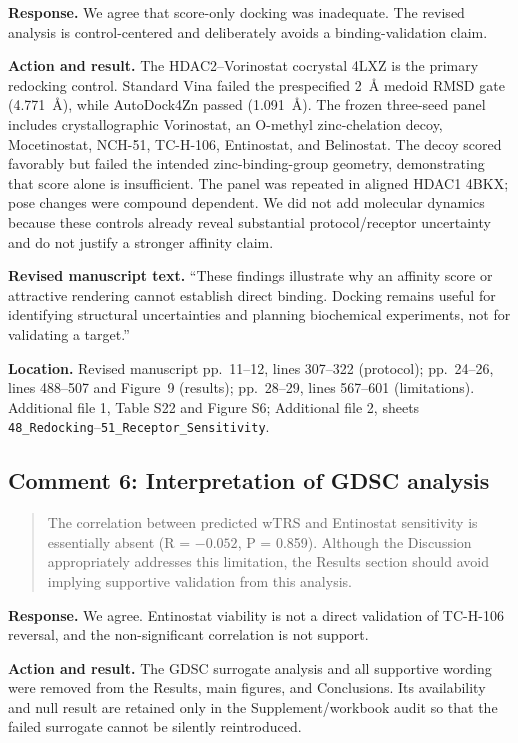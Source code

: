 \documentclass[10pt]{article}
\newenvironment{reviewcomment}{%
  \begin{quote}\small\itshape\color{black}
}{\end{quote}}
\newcommand{\Response}{\textbf{Response.} }
\newcommand{\Action}{\textbf{Action and result.} }
\newcommand{\RevisedText}{\textbf{Revised manuscript text.} }
\newcommand{\Location}{\textbf{Location.} }
\newcommand{\qtext}[1]{``#1''}
\begin{document}
\Response We agree that score-only docking was inadequate. The revised analysis is control-centered and deliberately avoids a binding-validation claim.

\Action The HDAC2--Vorinostat cocrystal 4LXZ is the primary redocking control. Standard Vina failed the prespecified 2~\AA{} medoid RMSD gate (4.771~\AA{}), while AutoDock4Zn passed (1.091~\AA{}). The frozen three-seed panel includes crystallographic Vorinostat, an O-methyl zinc-chelation decoy, Mocetinostat, NCH-51, TC-H-106, Entinostat, and Belinostat. The decoy scored favorably but failed the intended zinc-binding-group geometry, demonstrating that score alone is insufficient. The panel was repeated in aligned HDAC1 4BKX; pose changes were compound dependent. We did not add molecular dynamics because these controls already reveal substantial protocol/receptor uncertainty and do not justify a stronger affinity claim.

\RevisedText \qtext{These findings illustrate why an affinity score or attractive rendering cannot establish direct binding. Docking remains useful for identifying structural uncertainties and planning biochemical experiments, not for validating a target.}

\Location Revised manuscript pp.~11--12, lines 307--322 (protocol); pp.~24--26, lines 488--507 and Figure~9 (results); pp.~28--29, lines 567--601 (limitations). Additional file 1, Table S22 and Figure S6; Additional file 2, sheets \texttt{48\_Redocking}--\texttt{51\_Receptor\_Sensitivity}.

\subsection*{Comment 6: Interpretation of GDSC analysis}
\begin{reviewcomment}
The correlation between predicted wTRS and Entinostat sensitivity is essentially absent (R = $-0.052$, P = 0.859). Although the Discussion appropriately addresses this limitation, the Results section should avoid implying supportive validation from this analysis.
\end{reviewcomment}

\Response We agree. Entinostat viability is not a direct validation of TC-H-106 reversal, and the non-significant correlation is not support.

\Action The GDSC surrogate analysis and all supportive wording were removed from the Results, main figures, and Conclusions. Its availability and null result are retained only in the Supplement/workbook audit so that the failed surrogate cannot be silently reintroduced.
\end{document}
